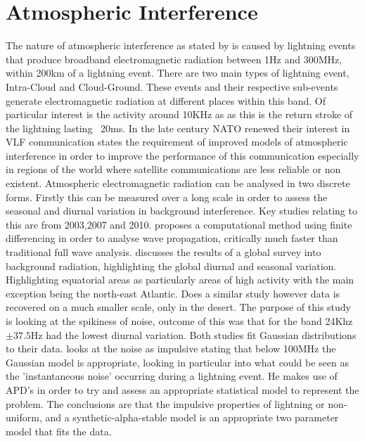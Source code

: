 \section{Atmospheric Interference}
The nature of atmospheric interference as stated by \cite{Rakov2013} is caused by lightning events that produce broadband electromagnetic radiation between 1Hz and 300MHz, within 200km of a lightning event. There are two main types of lightning event, Intra-Cloud and Cloud-Ground. These events and their respective sub-events generate electromagnetic radiation at different places within this band. Of particular interest is the activity around 10KHz as \cite{Fullekrug2013} as this is the return stroke of the lightning lasting ~20ms.
 In the late  century NATO renewed their interest in VLF communication \cite{Posterijen1964} states the requirement of improved models of atmospheric interference in order to improve the performance of this communication especially in regions of the world where satellite communications are less reliable or non existent.
 Atmospheric electromagnetic radiation can be analysed in two discrete forms. Firstly this can be measured over a long scale in order to assess the seasonal and diurnal variation in background interference. Key studies relating to this are from 2003,2007 and 2010. \cite{berenger2002} proposes a computational method using finite differencing in order to analyse wave propagation, critically much faster than traditional full wave analysis. \cite{Fieve2007} discusses the results of a global survey into background radiation, highlighting the global diurnal and seasonal variation. Highlighting equatorial areas as particularly areas of high activity with the main exception being the north-east Atlantic. \cite{Reuveni2010} Does a similar study however data is recovered on a much smaller scale, only in the desert. The purpose of this study is looking at the spikiness of noise, outcome of this was that for the band 24Khz $\pm37.5\si{\hertz}$ had the lowest diurnal variation. Both studies fit Gaussian distributions to their data. \cite{Chrissan2000} looks at the noise as impulsive stating that below 100MHz the Gaussian model is appropriate, looking in particular into what could be seen as the 'instantaneous noise' occurring during a lightning event. He makes use of APD's in order to try and assess an appropriate statistical model to represent the problem. The conclusions are that the impulsive properties of lightning or non-uniform, and a synthetic-alpha-stable model is an appropriate two parameter model that fits the data.


